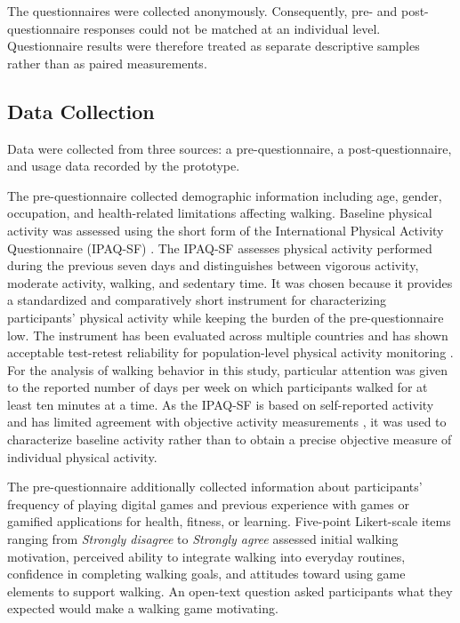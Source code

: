 The questionnaires were collected anonymously. Consequently, pre- and post-questionnaire responses could not be matched at an individual level. Questionnaire results were therefore treated as separate descriptive samples rather than as paired measurements.

\subsection{Data Collection}

Data were collected from three sources: a pre-questionnaire, a post-questionnaire, and usage data recorded by the prototype.

The pre-questionnaire collected demographic information including age, gender, occupation, and health-related limitations affecting walking. Baseline physical activity was assessed using the short form of the International Physical Activity Questionnaire (IPAQ-SF) \cite{Craig2003IPAQ}. The IPAQ-SF assesses physical activity performed during the previous seven days and distinguishes between vigorous activity, moderate activity, walking, and sedentary time. It was chosen because it provides a standardized and comparatively short instrument for characterizing participants' physical activity while keeping the burden of the pre-questionnaire low. The instrument has been evaluated across multiple countries and has shown acceptable test-retest reliability for population-level physical activity monitoring \cite{Craig2003IPAQ}. For the analysis of walking behavior in this study, particular attention was given to the reported number of days per week on which participants walked for at least ten minutes at a time. As the IPAQ-SF is based on self-reported activity and has limited agreement with objective activity measurements \cite{Lee2011IPAQValidity}, it was used to characterize baseline activity rather than to obtain a precise objective measure of individual physical activity.

The pre-questionnaire additionally collected information about participants' frequency of playing digital games and previous experience with games or gamified applications for health, fitness, or learning. Five-point Likert-scale items ranging from \textit{Strongly disagree} to \textit{Strongly agree} assessed initial walking motivation, perceived ability to integrate walking into everyday routines, confidence in completing walking goals, and attitudes toward using game elements to support walking. An open-text question asked participants what they expected would make a walking game motivating.

